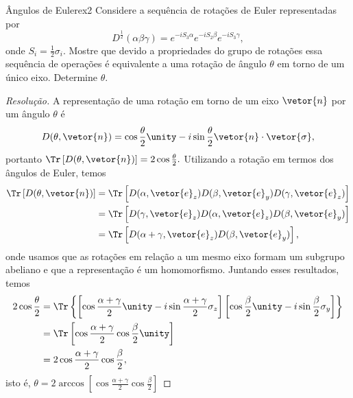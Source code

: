 \begin{exercício}{Ângulos de Euler}{ex2}
    Considere a sequência de rotações de Euler representadas por
    \begin{equation*}
        D^{\frac12}(\alpha \beta \gamma) = e^{-iS_3 \alpha} e^{-i S_2 \beta} e^{-i S_3 \gamma},
    \end{equation*}
    onde \(S_{i} = \frac12 \sigma_i.\) Mostre que devido a propriedades do grupo de rotações essa sequência de operações é equivalente a uma rotação de ângulo \(\theta\) em torno de um único eixo. Determine \(\theta\).
\end{exercício}
\begin{proof}[Resolução]
    A representação de uma rotação em torno de um eixo \(\vetor{n}\) por um ângulo \(\theta\) é
    \begin{equation*}
        D(\theta, \vetor{n}) = \cos\frac\theta2 \unity - i\sin\frac\theta2 \vetor{n}\cdot \vetor{\sigma},
    \end{equation*}
    portanto \(\Tr\left[D(\theta, \vetor{n})\right] = 2 \cos\frac\theta2.\) Utilizando a rotação em termos dos ângulos de Euler, temos
    \begin{align*}
        \Tr\left[D(\theta, \vetor{n})\right] &= \Tr\left[D(\alpha, \vetor{e}_z) D(\beta, \vetor{e}_y) D(\gamma, \vetor{e}_z)\right]\\
                                             &= \Tr\left[D(\gamma, \vetor{e}_z) D(\alpha, \vetor{e}_z) D(\beta, \vetor{e}_y)\right]\\
                                             &= \Tr\left[D(\alpha + \gamma, \vetor{e}_z)D(\beta, \vetor{e}_y)\right],
    \end{align*}
    onde usamos que as rotações em relação a um mesmo eixo formam um subgrupo abeliano e que a representação é um homomorfismo. Juntando esses resultados, temos
    \begin{align*}
        2\cos\frac\theta2 &= \Tr\left\{\left[\cos\frac{\alpha + \gamma}{2}\unity - i \sin\frac{\alpha + \gamma}2 \sigma_z\right]\left[\cos\frac\beta2 \unity - i \sin\frac\beta2 \sigma_y\right]\right\}\\
                          &= \Tr\left[\cos\frac{\alpha + \gamma}{2} \cos\frac\beta2 \unity\right]\\
                          &= 2 \cos\frac{\alpha + \gamma}2 \cos\frac{\beta}{2},
    \end{align*}
    isto é, \(\theta = 2\arccos\left[\cos\frac{\alpha + \gamma}2 \cos\frac{\beta}{2}\right]\)
\end{proof}
